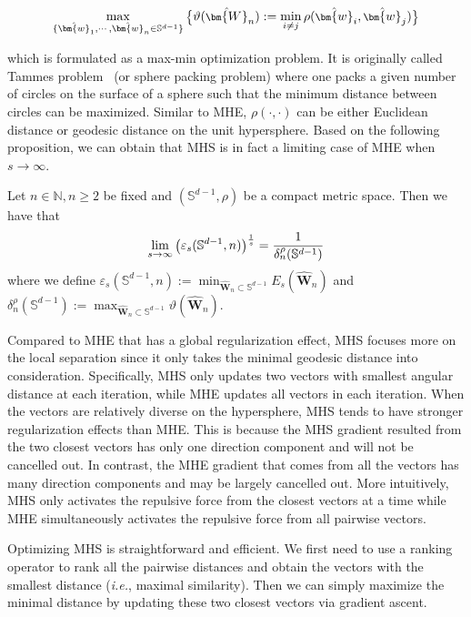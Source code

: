 \begin{equation}\label{sep_dis}
\footnotesize
    \max_{\{\hat{\bm{w}}_1,\cdots,\hat{\bm{w}}_n\in\mathbb{S}^{d-1}\}}\big{\{}\vartheta(\hat{\bm{W}}_n):=\min_{i\neq j} \rho(\hat{\bm{w}}_i,\hat{\bm{w}}_j)\big{\}}
\end{equation}

which is formulated as a max-min optimization problem. It is originally called Tammes problem~\cite{tammes1930origin} (or sphere packing problem) where one packs a given number of circles on the surface of a sphere such that the minimum distance between circles can be maximized. Similar to MHE, $\rho(\cdot,\cdot)$ can be either Euclidean distance or geodesic distance on the unit hypersphere. Based on the following proposition, we can obtain that MHS is in fact a limiting case of MHE when $s\rightarrow\infty$.

\begin{proposition}\label{mhs}
Let $n\in\mathbb{N},n\geq2$ be fixed and $(\mathbb{S}^{d-1},\rho)$ be a compact metric space. Then we have that
\begin{equation}
\footnotesize
    \lim_{s\rightarrow\infty}\big(\varepsilon_s(\mathbb{S}^{d-1},n)\big)^{\frac{1}{s}}=\frac{1}{\delta_n^{\rho}(\mathbb{S}^{d-1})}
\end{equation}
where we define $\varepsilon_s(\mathbb{S}^{d-1},n):=\min_{\hat{\bm{W}}_n\subset\mathbb{S}^{d-1}}E_s(\hat{\bm{W}}_n)$ and $\delta^{\rho}_n(\mathbb{S}^{d-1}):=\max_{\hat{\bm{W}}_n\subset\mathbb{S}^{d-1}}\vartheta(\hat{\bm{W}}_n)$.
\end{proposition}

Compared to MHE that has a global regularization effect, MHS focuses more on the local separation since it only takes the minimal geodesic distance into consideration. Specifically, MHS only updates two vectors with smallest angular distance at each iteration, while MHE updates all vectors in each iteration. When the vectors are relatively diverse on the hypersphere, MHS tends to have stronger regularization effects than MHE. This is because the MHS gradient resulted from the two closest vectors has only one direction component and will not be cancelled out. In contrast, the MHE gradient that comes from all the vectors has many direction components and may be largely cancelled out. More intuitively, MHS only activates the repulsive force from the closest vectors at a time while MHE simultaneously activates the repulsive force from all pairwise vectors.

Optimizing MHS is straightforward and efficient. We first need to use a ranking operator to rank all the pairwise distances and obtain the vectors with the smallest distance (\emph{i.e.}, maximal similarity). Then we can simply maximize the minimal distance by updating these two closest vectors via gradient ascent.

